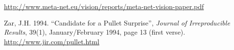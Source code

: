 \documentclass{../../metanetpaper}
\begin{document}
\begin{Parallel}[c]{79mm}{78mm}
\begin{thebibliography}{102}
\url{http://www.meta-net.eu/vision/reports/meta-net-vision-paper.pdf}

Zar, J.H. 1994. “Candidate for a Pullet Surprise”,
\emph{Journal of Irreproducible Results}, 39(1),
January/February 1994, page 13 (first verse).
\url{http://www.jir.com/pullet.html}

\end{thebibliography}

\clearpage

 \ParallelPar
 \end{Parallel}
 \center
 
\end{document}

